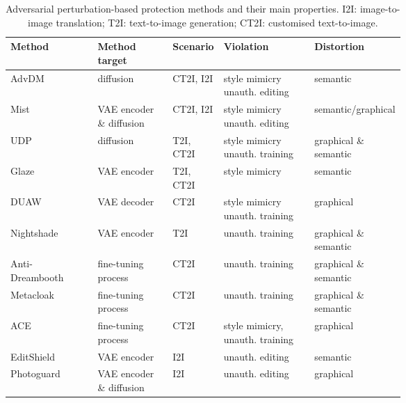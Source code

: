 
\begin{table*}
    \centering
\caption{Adversarial perturbation-based protection methods and their main properties. I2I: image-to-image translation; T2I: text-to-image generation; CT2I: customised text-to-image.}
\label{tab:adversarial-perturbations}
    \begin{tabular}{l|>{\raggedright\arraybackslash}p{0.19\linewidth}>{\raggedright\arraybackslash}p{0.08\linewidth}>{\raggedright\arraybackslash}p{0.23\linewidth}>{\raggedright\arraybackslash}p{0.16\linewidth}}
 \toprule
 \textbf{Method}& \textbf{Method target}& \textbf{Scenario} & \textbf{Violation} & \textbf{Distortion}\\
 \midrule
         AdvDM~\cite{liang_adversarial_2023}&  diffusion&  CT2I, I2I &  style mimicry
unauth. editing & semantic\\
         Mist~\cite{liang_mist_2023}&  VAE encoder \& diffusion&  CT2I, I2I &  style mimicry
unauth. editing& semantic/graphical \\
         UDP~\cite{zhao_unlearnable_2023}&  diffusion& T2I, CT2I &  style mimicry
unauth. training&graphical \& semantic\\
         Glaze~\cite{shan_glaze_2023}&  VAE encoder& T2I, CT2I &  style mimicry& semantic\\
         DUAW~\cite{ye_duaw_2023}&  VAE decoder& CT2I &  style mimicry
unauth. training& graphical\\
Nightshade~\cite{shan_prompt-specific_2023} & VAE encoder & T2I & unauth. training   & graphical \& semantic \\
 Anti-Dreambooth~\cite{van_le_anti-dreambooth_2023} & fine-tuning process & CT2I & unauth. training & graphical \& semantic\\ 
 Metacloak~\cite{liu_toward_2023} & fine-tuning process & CT2I & unauth. training & graphical \& semantic\\
 ACE~\cite{zheng_understanding_2023} & fine-tuning process & CT2I & style mimicry, unauth. training & graphical\\
 EditShield~\cite{chen_editshield_2023}&  VAE encoder&  I2I&  unauth. editing& semantic\\
 Photoguard~\cite{salman_raising_2023}& VAE encoder \& diffusion& I2I& unauth. editing& graphical\\
 \bottomrule
    \end{tabular}
    
    
\end{table*}